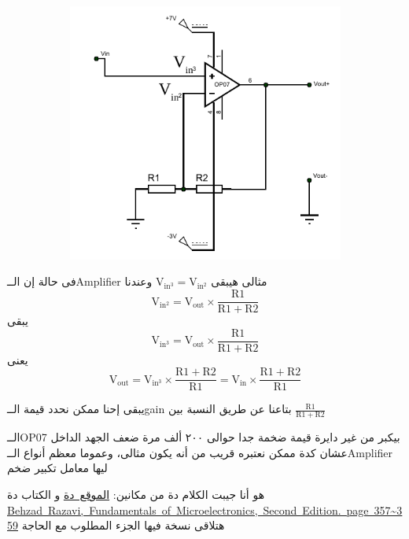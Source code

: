 \documentclass{article}
\begin{document}
\begin{figure}[!ht]
\begin{subfigure}{0.45\linewidth}
        \includegraphics[width=\linewidth]{op amp cut exp.pdf}
        \caption{}
    \end{subfigure}
    \caption{}\label{fig:opampcut}
\end{figure}

فى حالة إن الــ\textenglish{Amplifier} مثالى هيبقى $\mathrm{V_{in^3} = V_{in^2}}$ وعندنا
\[\mathrm{ V_{in^2} = V_{out} \times \frac{R1}{R1+R2} }\]
يبقى 
\[\mathrm{ V_{in^3} = V_{out} \times \frac{R1}{R1+R2} }\]
يعنى
\begin{equation}
    \mathrm{  V_{out} = V_{in^3} \times \frac{R1+R2}{R1} = V_{in} \times \frac{R1+R2}{R1} }    
\end{equation}\label{eq:vout-in-rel}


\noindent يبقى إحنا ممكن نحدد قيمة الــ\textenglish{gain} بتاعنا عن طريق النسبة بين $\textstyle\mathrm{\frac{R1}{R1+R2}}$

الــ\textenglish{OP07} بيكبر من غير دايرة قيمة ضخمة جدا حوالى ٢٠٠ ألف مرة ضعف الجهد الداخل عشان كدة ممكن نعتبره قريب من أنه يكون مثالى،
وعموما معظم أنواع الــ\textenglish{Amplifier} ليها معامل تكبير ضخم

هو أنا جيبت الكلام دة من مكانين:
 \hyperref{https://www.electronics-tutorials.ws/opamp/opamp_3.html}{}{}{الموقع~دة}
 و الكتاب دة \\
 \hyperref{Behzad Razavi - Fundamentals of Microelectronics (2013, Wiley).pdf}{}{}{\textenglish{Behzad~Razavi,~Fundamentals~of~Microelectronics,~Second~Edition.~page~357\~{}359}} هتلاقى نسخة فيها الجزء المطلوب مع الحاجة
\end{document}
